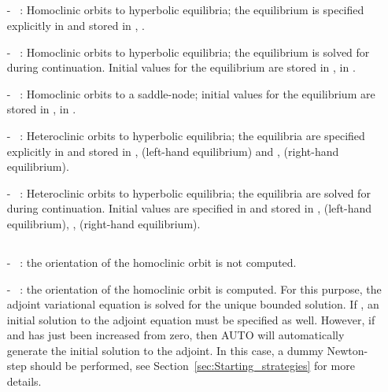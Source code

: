 \documentclass[12pt]{report}
\begin{document}
\subsection{}  \label{sec:IEQUIB}
\begin{itemize}
\item[-] ~: 
Homoclinic orbits to hyperbolic equilibria;  
the equilibrium is specified explicitly in  and stored in
, .
\item[-] ~: 
Homoclinic orbits to hyperbolic equilibria;  
the equilibrium is solved for during continuation. Initial values for
the equilibrium are stored in ,  in .
\item[-] ~: 
Homoclinic orbits to a saddle-node; initial values for
the equilibrium are stored in ,  in .
\item[-] ~: 
Heteroclinic orbits to hyperbolic equilibria;
the equilibria are specified explicitly in  and stored in
,  
 (left-hand equilibrium) and , 
 (right-hand equilibrium). 
\item[-] ~: 
Heteroclinic orbits to hyperbolic equilibria;
the equilibria are solved for during continuation. Initial values are
specified in  and stored in ,  (left-hand equilibrium), 
,  (right-hand equilibrium).
\end{itemize}

\subsection{}  \label{sec:ITWIST}
\begin{itemize}
\item[-] ~: 
the orientation of the homoclinic orbit is not computed.
\item[-] ~: 
the orientation of the homoclinic orbit is computed. For this purpose, the
adjoint variational equation is solved for the unique bounded
solution. If , an initial solution to the adjoint equation
must be specified as well. However, if  and  
has just been increased from zero, then {\cal AUTO} will
automatically generate the initial solution to the adjoint. 
In this case, a dummy Newton-step should be performed, see 
Section~\ref{sec:Starting_strategies} for more details.
\end{itemize}
\end{document}
